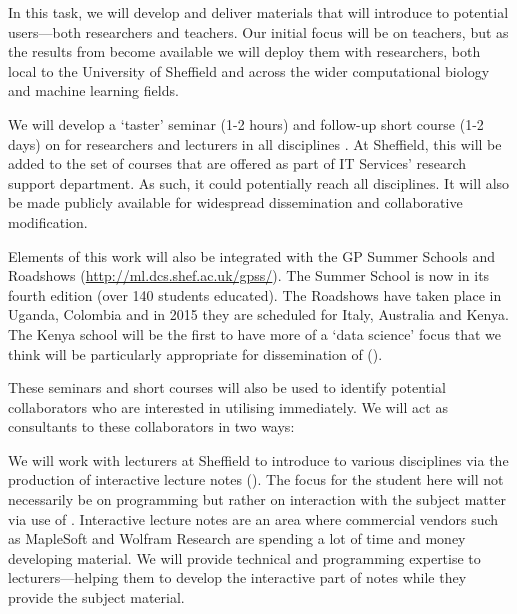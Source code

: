 \begin{workpackage}
\begin{tasklist}
\begin{task}[title=Introduce \TheProject to Researchers and Teachers, id=project-intro,lead=USH,wphases=6-44,PM=20,partners={USO,XFEL}, issue=29]
  In this task, we will develop and deliver materials that will introduce \TheProject to
  potential users---both researchers and teachers. Our initial focus will be on teachers,
  but as the results from  become available we will deploy them with
  researchers, both local to the University of Sheffield and across the wider
  computational biology and machine learning fields.

  We will develop a `taster' seminar (1-2 hours) and follow-up short course
  (1-2 days) on \TheProject for researchers and lecturers in all
  disciplines . At Sheffield, this will
  be added to the set of courses that are offered as part of IT
  Services' research support department. As such, it could potentially
  reach all disciplines. It will also be made publicly available for
  widespread dissemination and collaborative modification.

  Elements of this work will also be integrated with the GP Summer
  Schools and Roadshows (\url{http://ml.dcs.shef.ac.uk/gpss/}). The
  Summer School is now in its fourth edition (over 140 students
  educated). The Roadshows have taken place in Uganda, Colombia and in
  2015 they are scheduled for Italy, Australia and Kenya. The Kenya
  school will be the first to have more of a `data science' focus that
  we think will be particularly appropriate for dissemination of
  \TheProject ().

  These seminars and short courses will also be used to identify
  potential collaborators who are interested in utilising \TheProject
  immediately. We will act as consultants to these collaborators in
  two ways:

  We will work with lecturers at Sheffield to introduce \TheProject to
  various disciplines via the production of interactive lecture notes
  (). The focus for the student here
  will not necessarily be on programming but rather on interaction
  with the subject matter via use of \TheProject. Interactive lecture
  notes are an area where commercial vendors such as MapleSoft and
  Wolfram Research are spending a lot of time and money developing
  material. We will provide technical and programming expertise to
  lecturers---helping them to develop the interactive part of notes
  while they provide the subject material.


\end{task}
\end{tasklist}
\end{workpackage}
